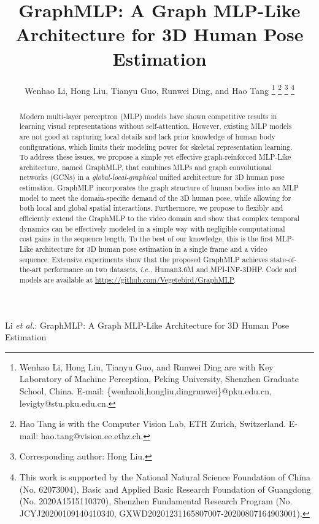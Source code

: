 \documentclass[lettersize,journal]{IEEEtran}
\begin{document}
\title{GraphMLP: A Graph MLP-Like Architecture for 3D Human Pose Estimation}

\author{
Wenhao Li, Hong Liu, Tianyu Guo, Runwei Ding, and Hao Tang
\thanks{Wenhao Li, Hong Liu, Tianyu Guo, and Runwei Ding are with Key Laboratory of Machine Perception, Peking University, Shenzhen Graduate School, China. 
E-mail: \{wenhaoli,hongliu,dingrunwei\}@pku.edu.cn, levigty@stu.pku.edu.cn.}
\thanks{Hao Tang is with the Computer Vision Lab, ETH Zurich, Switzerland. 
E-mail: hao.tang@vision.ee.ethz.ch.}
\thanks{Corresponding author: Hong Liu.}
\thanks{This work is supported by the National Natural Science Foundation of China (No. 62073004), Basic and Applied Basic Research Foundation of Guangdong (No. 2020A1515110370), Shenzhen Fundamental Research Program (No. JCYJ20200109140410340, GXWD20201231165807007-20200807164903001).}
}

\markboth{}
{Li \MakeLowercase{\textit{et al.}}: 
GraphMLP: A Graph MLP-Like Architecture for 3D Human Pose Estimation}

\maketitle

\begin{abstract}
Modern multi-layer perceptron (MLP) models have shown competitive results in learning visual representations without self-attention. However, existing MLP models are not good at capturing local details and lack prior knowledge of human body configurations, which limits their modeling power for skeletal representation learning. To address these issues, we propose a simple yet effective graph-reinforced MLP-Like architecture, named GraphMLP, that combines MLPs and graph convolutional networks (GCNs) in a \textit{global-local-graphical} unified architecture for 3D human pose estimation. GraphMLP incorporates the graph structure of human bodies into an MLP model to meet the domain-specific demand of the 3D human pose, while allowing for both local and global spatial interactions. Furthermore, we propose to flexibly and efficiently extend the GraphMLP to the video domain and show that complex temporal dynamics can be effectively modeled in a simple way with negligible computational cost gains in the sequence length. To the best of our knowledge, this is the first MLP-Like architecture for 3D human pose estimation in a single frame and a video sequence. Extensive experiments show that the proposed GraphMLP achieves state-of-the-art performance on two datasets, \emph{i.e.}, Human3.6M and MPI-INF-3DHP. Code and models are available at \url{https://github.com/Vegetebird/GraphMLP}. 
\end{abstract}
\end{document}
